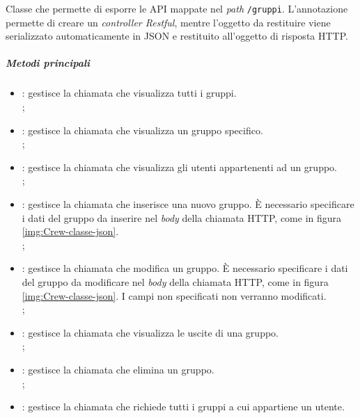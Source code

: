 \label{par:GruppiController}
Classe che permette di esporre le \gls{API} mappate nel \textit{path}
\texttt{/gruppi}.
L'annotazione  permette di creare un \textit{controller
    Restful}, mentre l'oggetto da restituire viene serializzato automaticamente
in
JSON
e restituito all'oggetto di risposta HTTP.
\subparagraph*{Metodi principali}
\begin{itemize}
    \item {}: gestisce la chiamata che visualizza tutti i
          gruppi.\\ ;
    \item {}:  gestisce la chiamata che visualizza un gruppo
          specifico. \\ ;
    \item {}: gestisce la chiamata che visualizza gli
          utenti appartenenti ad un gruppo. \\
          ;
    \item {}: gestisce la chiamata che inserisce una nuovo
          gruppo. È necessario specificare i dati del gruppo da inserire nel
          \textit{body} della chiamata HTTP, come in figura
          \ref{img:Crew-classe-json}.
          \\ ;
    \item {}: gestisce la chiamata che modifica un gruppo. È
          necessario specificare i dati del gruppo da modificare nel
          \textit{body} della
          chiamata HTTP, come in figura \ref{img:Crew-classe-json}. I campi non
          specificati non verranno modificati. \\
          ;
    \item {}: gestisce la chiamata che visualizza le
          uscite di una gruppo.\\ ;
    \item {}: gestisce la chiamata che elimina un gruppo. \\
          ;
    \item {}: gestisce la chiamata che richiede tutti i
          gruppi a cui appartiene un utente. \\

\end{itemize}
